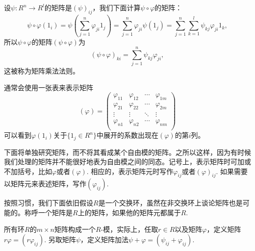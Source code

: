 设$\psi:R^n\to R^l$的矩阵是$(\psi)_{ij}$，我们下面计算$\psi\circ\varphi$的矩阵：
\[
	\psi\circ\varphi(1_i)=\psi\left(\sum_{j=1}^n\varphi_{ji}1_j\right)=\sum_{j=1}^n\varphi_{ji}\psi(1_j)=\sum_{j=1}^n\sum_{k=1}^l\psi_{kj}\varphi_{ji}1_k,
\]
所以$\psi\circ\varphi$的矩阵$(\psi\circ\varphi)$为
\[
	(\psi\circ\varphi)_{ki}=\sum_{j=1}^n\psi_{kj}\varphi_{ji},
\]
这被称为矩阵乘法法则。

\para 通常会使用一张表来表示矩阵
\[
(\varphi)=
\begin{pmatrix}
	\varphi_{11} & \varphi_{12} & \cdots & \varphi_{1m}\\
	\varphi_{21} & \varphi_{22} & \cdots & \varphi_{2m}\\
	\vdots & \vdots & \ddots & \vdots \\
	\varphi_{n1} & \varphi_{n2} & \cdots & \varphi_{nm}\\
\end{pmatrix}
\]
可以看到$\varphi(1_i)$关于$\{1_j\in R^n\}$中展开的系数出现在$(\varphi)$的第$i$列。

下面将单独研究矩阵，而不将其看成某个自由模的矩阵。之所以这样，因为有时候我们处理的矩阵并不能很好地表为自由模之间的同态。记号上，表示矩阵时可加或不加括号，比如$\varphi$或者$(\varphi)$. 相应的，表示矩阵元时写作$\varphi_{ij}$或者$(\varphi)_{ij}$. 如果需要以矩阵元来表述矩阵，写作$(\varphi_{ij})$. 

按照习惯，我们下面依旧假设$R$是一个交换环，虽然在非交换环上谈论矩阵也是可能的。称呼一个矩阵是$R$上的矩阵，如果他的矩阵元都属于$R$.

所有环$R$的$m\times n$矩阵构成一个$R$-模，实际上，任取$r\in R$以及矩阵$\varphi$，定义矩阵$r\varphi= (r\varphi_{ij})$. 另取矩阵$\psi$，定义矩阵加法$\psi+\varphi=(\psi_{ij}+\varphi_{ij})$.

